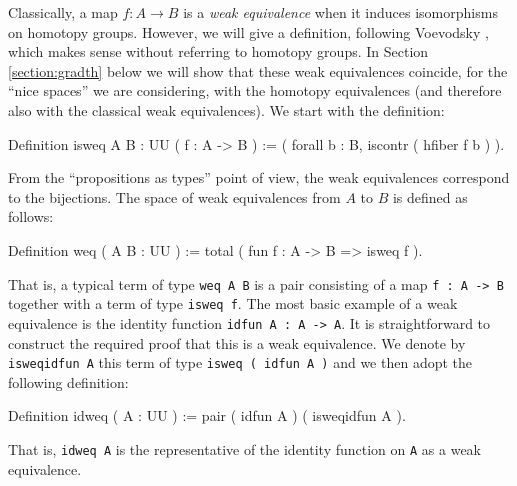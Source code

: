 Classically, a map $f:A\to B$ is a \emph{weak equivalence} when it
induces isomorphisms on homotopy groups.  However, we will give a
definition, following Voevodsky \cite{Vo2012a}, which makes sense without referring
to homotopy groups.  In Section \ref{section:gradth} below we will
show that these weak equivalences coincide, for the ``nice spaces'' we
are considering, with the homotopy equivalences (and therefore also with
the classical weak equivalences).  We start with the definition:
\begin{center}
  \begin{coqcode}
Definition isweq { A B : UU } ( f : A -> B ) := ( forall b : B, iscontr ( hfiber f b ) ).
  \end{coqcode}
\end{center}
From the ``propositions as types'' point of view, the weak
equivalences correspond to the bijections.  The space of weak
equivalences from $A$ to $B$ is defined as follows:
\begin{center}
  \begin{coqcode}
Definition weq ( A B : UU ) := total ( fun f : A -> B => isweq f ).
  \end{coqcode}
\end{center}
That is, a typical term of type \verb|weq A B| is a pair
consisting of a map \verb|f : A -> B| together with a term of
type \verb|isweq f|.  The most basic example of a weak equivalence
is the identity function \verb|idfun A : A -> A|.  It is
straightforward to construct the required proof that this is a weak
equivalence.  We denote by \verb|isweqidfun A| this term of type 
\verb|isweq ( idfun A )| and we then adopt the following definition:
\begin{center}
  \begin{coqcode}
Definition idweq ( A : UU ) := pair ( idfun A ) ( isweqidfun A ).
  \end{coqcode}
\end{center}
That is, \verb|idweq A| is the representative of the identity
function on \verb|A| as a weak equivalence.  

